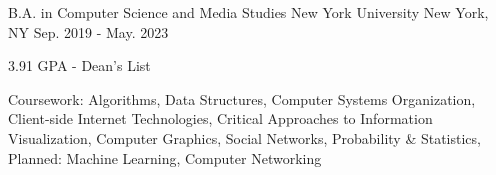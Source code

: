 

\begin{cventries}
  \cventry
    {B.A. in Computer Science and Media Studies} %
    {New York University} %
    {New York, NY} %
    {Sep. 2019 - May. 2023} %
    {
      \begin{cvitems} %
        \item {3.91 GPA - Dean's List}
        \item {Coursework: Algorithms, Data Structures, Computer Systems Organization, Client-side Internet Technologies, Critical Approaches to Information Visualization, Computer Graphics, Social Networks, Probability \& Statistics, Planned: Machine Learning, Computer Networking}
      \end{cvitems}
    }
\end{cventries}
